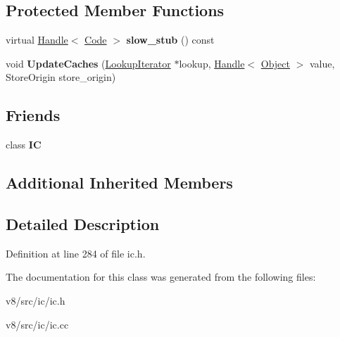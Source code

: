 \subsection*{Protected Member Functions}
\begin{DoxyCompactItemize}
\item 
\mbox{\label{classv8_1_1internal_1_1StoreIC_aab4886dd7bd5e3ae20200654b9470632}} 
virtual \mbox{\hyperlink{classv8_1_1internal_1_1Handle}{Handle}}$<$ \mbox{\hyperlink{classv8_1_1internal_1_1Code}{Code}} $>$ {\bfseries slow\+\_\+stub} () const
\item 
\mbox{\label{classv8_1_1internal_1_1StoreIC_a0c80d01c94fb7fa6d078002736a9c454}} 
void {\bfseries Update\+Caches} (\mbox{\hyperlink{classv8_1_1internal_1_1LookupIterator}{Lookup\+Iterator}} $\ast$lookup, \mbox{\hyperlink{classv8_1_1internal_1_1Handle}{Handle}}$<$ \mbox{\hyperlink{classv8_1_1internal_1_1Object}{Object}} $>$ value, Store\+Origin store\+\_\+origin)
\end{DoxyCompactItemize}
\subsection*{Friends}
\begin{DoxyCompactItemize}
\item 
\mbox{\label{classv8_1_1internal_1_1StoreIC_ae59e849648858af1fd22081890d47b78}} 
class {\bfseries IC}
\end{DoxyCompactItemize}
\subsection*{Additional Inherited Members}


\subsection{Detailed Description}


Definition at line 284 of file ic.\+h.



The documentation for this class was generated from the following files\+:\begin{DoxyCompactItemize}
\item 
v8/src/ic/ic.\+h\item 
v8/src/ic/ic.\+cc\end{DoxyCompactItemize}
